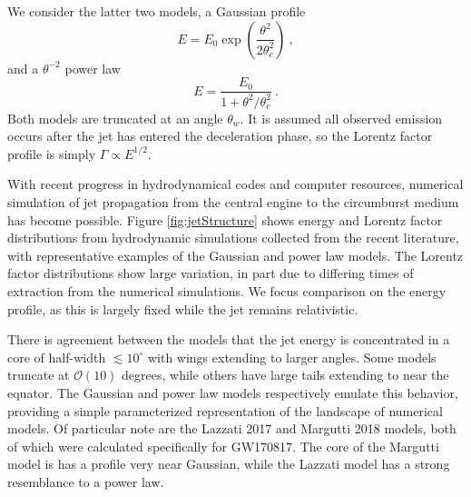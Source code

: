 \documentclass[twocolumn]{aastex62}
\begin{document}
We consider the latter two models, a Gaussian profile
\begin{equation}
	E = E_0 \exp\left( \frac{\theta^2 }{2 \theta_c^2}\right)\ , \label{eq:Gaussian}
\end{equation}
and a $\theta^{-2}$ power law
\begin{equation}
	E = \frac{E_0}{1 + \theta^2/\theta_c^2}\ . \label{eq:powerlaw}
\end{equation}
Both models are truncated at an angle $\theta_w$. It is assumed all observed emission occurs after the jet has entered the deceleration phase, so the Lorentz factor profile is simply $\Gamma \propto E^{1/2}$.

With recent progress in hydrodynamical codes and computer resources, numerical simulation of jet propagation from the central engine to the circumburst medium has become possible.  Figure \ref{fig:jetStructure} shows energy and Lorentz factor distributions from hydrodynamic simulations collected from the recent literature, with representative examples of the Gaussian and power law models. The Lorentz factor distributions show large variation, in part due to differing times of extraction from the numerical simulations.  We focus comparison on the energy profile, as this is largely fixed while the jet remains relativistic. 

\begin{figure}
\end{figure}

There is agreement between the models that the jet energy is concentrated in a core of half-width $\lesssim 10^\circ$ with wings extending to larger angles.  Some models truncate at $\mathcal{O}(10)$ degrees, while others have large tails extending to near the equator.  The Gaussian and power law models respectively emulate this behavior, providing a simple parameterized representation of the landscape of numerical models.  Of particular note are the Lazzati 2017 and Margutti 2018 models, both of which were calculated specifically for GW170817. The core of the Margutti model is has a profile very near Gaussian, while the Lazzati model has a strong resemblance to a power law.  



\end{document}
